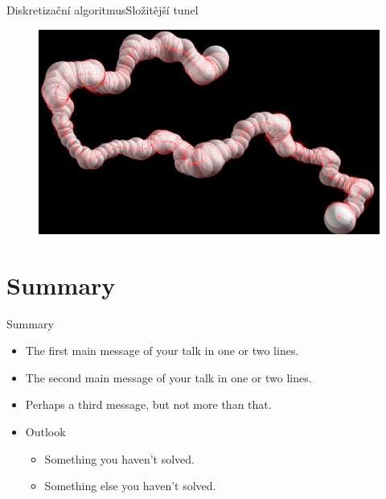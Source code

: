 \documentclass{beamer}
\begin{document}
\begin{frame}{Diskretizační algoritmus}{Složitější tunel}
    \begin{figure}
        \includegraphics[width=\textwidth]{img/1YGE.png}
    \end{figure}
\end{frame}

\section*{Summary}

\begin{frame}{Summary}
  \begin{itemize}
  \item
    The \alert{first main message} of your talk in one or two lines.
  \item
    The \alert{second main message} of your talk in one or two lines.
  \item
    Perhaps a \alert{third message}, but not more than that.
  \end{itemize}
  
  \begin{itemize}
  \item
    Outlook
    \begin{itemize}
    \item
      Something you haven't solved.
    \item
      Something else you haven't solved.
    \end{itemize}
  \end{itemize}
\end{frame}
\end{document}
